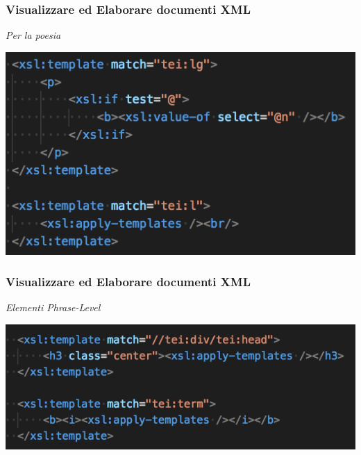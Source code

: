 \begin{frame}
    \frametitle{Visualizzare ed Elaborare documenti XML}
    \addtocounter{nframe}{1}
    
        \textit{Per la poesia}

    \begin{center}
        \includegraphics[width=.8\textwidth]{imgs/EsempioCommentato6.png}
    \end{center}

\end{frame}


\begin{frame}
    \frametitle{Visualizzare ed Elaborare documenti XML}
    \addtocounter{nframe}{1}
    
        \textit{Elementi Phrase-Level}

    \begin{center}
        \includegraphics[width=.8\textwidth]{imgs/EsempioCommentato7.png}
    \end{center}

\end{frame}


